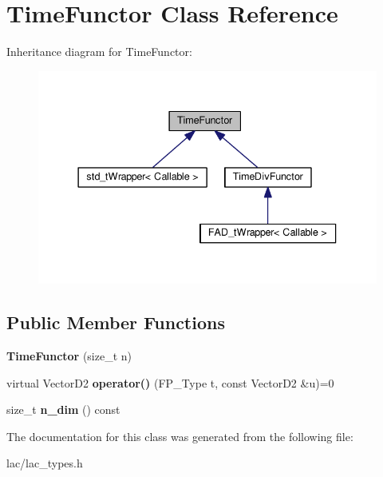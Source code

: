 \hypertarget{classTimeFunctor}{}\section{Time\+Functor Class Reference}
\label{classTimeFunctor}


Inheritance diagram for Time\+Functor\+:
\nopagebreak
\begin{figure}[H]
\begin{center}
\leavevmode
\includegraphics[width=337pt]{classTimeFunctor__inherit__graph}
\end{center}
\end{figure}
\subsection*{Public Member Functions}
\begin{DoxyCompactItemize}
\item 
\mbox{\label{classTimeFunctor_a22c7b6de02ff9ae0658ea3257026f036}} 
{\bfseries Time\+Functor} (size\+\_\+t n)
\item 
\mbox{\label{classTimeFunctor_a70a13b078de40b96485ee4685d23a63f}} 
virtual Vector\+D2 {\bfseries operator()} (F\+P\+\_\+\+Type t, const Vector\+D2 \&u)=0
\item 
\mbox{\label{classTimeFunctor_a48fd5f83984826085067f21a54e3123e}} 
size\+\_\+t {\bfseries n\+\_\+dim} () const
\end{DoxyCompactItemize}


The documentation for this class was generated from the following file\+:\begin{DoxyCompactItemize}
\item 
lac/lac\+\_\+types.\+h\end{DoxyCompactItemize}
